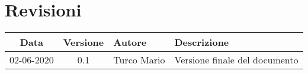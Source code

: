 %
%	 
%

\chapter*{Revisioni}
\begin{center}
    \begin{table}[h]
        \begin{tabularx}{\textwidth}[t]{|c|c|X|X|} 
            \hline
            Data & Versione & Autore & Descrizione\\ 
            \hline
            02-06-2020 & 0.1 & Turco Mario  & Versione finale del documento\\  
            \hline
        \end{tabularx}
    \end{table}
\end{center}